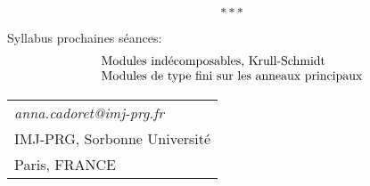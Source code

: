 \documentclass[a4paper, 12pt]{amsart}
\begin{document}
   $$***$$ 
 
\noindent Syllabus prochaines s\'eances:\\
$$ \begin{tabular}[t]{l}
 
Modules ind\'ecomposables, Krull-Schmidt\\
Modules de type fini sur les anneaux principaux\\
\end{tabular}$$
 \noindent \begin{tabular}[t]{l}
\textit{anna.cadoret@imj-prg.fr}\\
 IMJ-PRG, Sorbonne Universit\'e\\
 Paris, FRANCE
\end{tabular}
 \printindex
\end{document}
